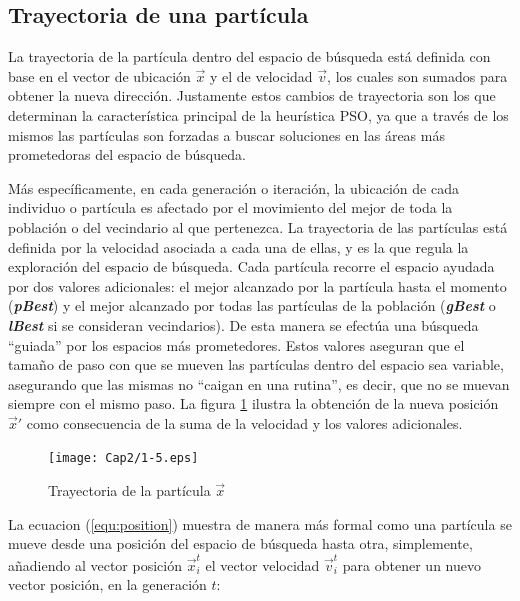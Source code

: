     \subsection{Trayectoria de una part\'icula}
    
    La trayectoria de la part\'icula dentro del espacio de b\'usqueda est\'a definida con base en el vector de ubicaci\'on $\vec{x}$ 
    y el de velocidad $\vec{v}$, los cuales son sumados para obtener la nueva direcci\'on. Justamente estos cambios de trayectoria 
    son los que determinan la caracter\'istica principal de la heur\'istica PSO, ya que a trav\'es de los mismos las part\'iculas son 
    forzadas a buscar soluciones en las \'areas m\'as prometedoras del espacio de b\'usqueda.

    M\'as espec\'ificamente, en cada generaci\'on o iteraci\'on, la ubicaci\'on de cada individuo o part\'icula es afectado por el movimiento 
    del mejor de toda la poblaci\'on o del vecindario al que pertenezca. La trayectoria de las part\'iculas est\'a definida
    por la velocidad asociada a cada una de ellas, y es la que regula la exploraci\'on del espacio de b\'usqueda. Cada part\'icula 
    recorre el espacio ayudada por dos valores adicionales: el mejor alcanzado por la part\'icula hasta el momento (\textbf{\textit{pBest}}) 
    y el mejor alcanzado por todas las part\'iculas de la poblaci\'on (\textbf{\textit{gBest}} o \textbf{\textit{lBest}} si se consideran 
    vecindarios). De esta manera se efect\'ua una b\'usqueda ``guiada'' por los espacios m\'as prometedores. Estos valores aseguran que 
    el tama\~no de paso con que se mueven las part\'iculas dentro del espacio sea variable, asegurando que las mismas no ``caigan en una rutina'', 
    es decir, que no se muevan siempre con el mismo paso. La figura \ref{fig:trayec} ilustra la obtenci\'on de la nueva posici\'on 
    $\vec{x}'$ como consecuencia de la suma de la velocidad y los valores adicionales.

    \begin{figure}
	\centering
	\texttt{[image: Cap2/1-5.eps]}
	  \caption{Trayectoria de la part\'icula $\vec{x}$}
      \label{fig:trayec}
      \end{figure}
    
     La ecuacion (\ref{equ:position}) muestra de manera m\'as formal como una part\'icula se mueve desde una posici\'on del espacio de b\'usqueda hasta otra, simplemente, a\~nadiendo 
     al vector posici\'on $\vec{x}^t_i$ el vector velocidad $\vec{v}^t_i$ para obtener un nuevo vector posici\'on, en la 
     generaci\'on $t$:
      
